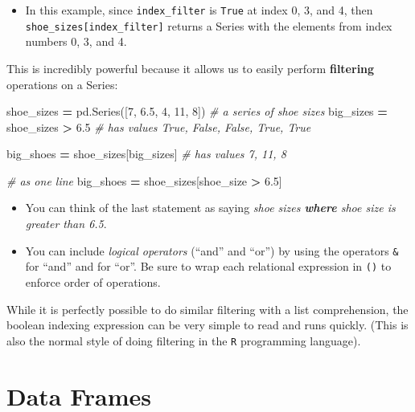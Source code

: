 \documentclass[]{book}
\newenvironment{Shaded}{\begin{snugshade}}{\end{snugshade}}
\newcommand{\DecValTok}[1]{\textcolor[rgb]{0.00,0.00,0.81}{#1}}
\newcommand{\FloatTok}[1]{\textcolor[rgb]{0.00,0.00,0.81}{#1}}
\newcommand{\CommentTok}[1]{\textcolor[rgb]{0.56,0.35,0.01}{\textit{#1}}}
\newcommand{\OperatorTok}[1]{\textcolor[rgb]{0.81,0.36,0.00}{\textbf{#1}}}
\newcommand{\NormalTok}[1]{#1}
\providecommand{\tightlist}{%
  \setlength{\itemsep}{0pt}\setlength{\parskip}{0pt}}
\begin{document}
\begin{itemize}
\tightlist
\item
  In this example, since \texttt{index\_filter} is \texttt{True} at
  index 0, 3, and 4, then \texttt{shoe\_sizes{[}index\_filter{]}}
  returns a Series with the elements from index numbers 0, 3, and 4.
\end{itemize}

This is incredibly powerful because it allows us to easily perform
\textbf{filtering} operations on a Series:

\begin{Shaded}
\begin{Highlighting}[]
\NormalTok{shoe_sizes }\OperatorTok{=}\NormalTok{ pd.Series([}\DecValTok{7}\NormalTok{, }\FloatTok{6.5}\NormalTok{, }\DecValTok{4}\NormalTok{, }\DecValTok{11}\NormalTok{, }\DecValTok{8}\NormalTok{])  }\CommentTok{# a series of shoe sizes}
\NormalTok{big_sizes }\OperatorTok{=}\NormalTok{ shoe_sizes }\OperatorTok{>} \FloatTok{6.5}  \CommentTok{# has values True, False, False, True, True}

\NormalTok{big_shoes }\OperatorTok{=}\NormalTok{ shoe_sizes[big_sizes]  }\CommentTok{# has values 7, 11, 8}

\CommentTok{# as one line}
\NormalTok{big_shoes }\OperatorTok{=}\NormalTok{ shoe_sizes[shoe_size }\OperatorTok{>} \FloatTok{6.5}\NormalTok{]}
\end{Highlighting}
\end{Shaded}

\begin{itemize}
\item
  You can think of the last statement as saying \emph{shoe sizes
  \textbf{where} shoe size is greater than 6.5}.
\item
  You can include \emph{logical operators} (``and'' and ``or'') by using
  the operators \texttt{\&} for ``and'' and \texttt{\textbar{}} for
  ``or''. Be sure to wrap each relational expression in \texttt{()} to
  enforce order of operations.
\end{itemize}

While it is perfectly possible to do similar filtering with a list
comprehension, the boolean indexing expression can be very simple to
read and runs quickly. (This is also the normal style of doing filtering
in the \texttt{R} programming language).

\hypertarget{data-frames}{\section{Data Frames}\label{data-frames}}
\end{document}
